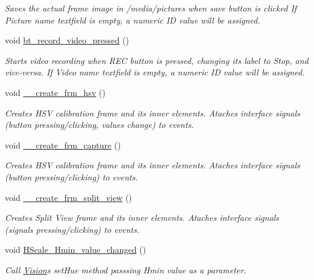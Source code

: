 \begin{DoxyCompactItemize}
\begin{DoxyCompactList}\small\item\em Saves the actual frame image in /media/pictures when \textquotesingle{}save\textquotesingle{} button is clicked If \textquotesingle{}Picture name\textquotesingle{} textfield is empty, a numeric ID value will be assigned. \end{DoxyCompactList}\item 
void \hyperlink{class_vision_g_u_i_a78a250ff8c2520a56dce79d824dbeb85}{bt\+\_\+record\+\_\+video\+\_\+pressed} ()
\begin{DoxyCompactList}\small\item\em Starts video recording when \textquotesingle{}R\+EC\textquotesingle{} button is pressed, changing its label to \textquotesingle{}Stop\textquotesingle{}, and vice-\/versa. If \textquotesingle{}Video name\textquotesingle{} textfield is empty, a numeric ID value will be assigned. \end{DoxyCompactList}\item 
void \hyperlink{class_vision_g_u_i_a5022537a86f97e3eb1e037044301a0f7}{\+\_\+\+\_\+create\+\_\+frm\+\_\+hsv} ()
\begin{DoxyCompactList}\small\item\em Creates H\+SV calibration frame and its inner elements. Ataches interface signals (button pressing/clicking, values change) to events. \end{DoxyCompactList}\item 
void \hyperlink{class_vision_g_u_i_a9b0cac7f32fc402ce5aaff0325e39b77}{\+\_\+\+\_\+create\+\_\+frm\+\_\+capture} ()
\begin{DoxyCompactList}\small\item\em Creates H\+SV calibration frame and its inner elements. Ataches interface signals (button pressing/clicking) to events. \end{DoxyCompactList}\item 
void \hyperlink{class_vision_g_u_i_aab78b384bacc2a12d385b1baef011ed4}{\+\_\+\+\_\+create\+\_\+frm\+\_\+split\+\_\+view} ()
\begin{DoxyCompactList}\small\item\em Creates Split View frame and its inner elements. Ataches interface signals (signals pressing/clicking) to events. \end{DoxyCompactList}\item 
void \hyperlink{class_vision_g_u_i_a8c01178ecd9d517e941bd6075d69bcdd}{H\+Scale\+\_\+\+Hmin\+\_\+value\+\_\+changed} ()
\begin{DoxyCompactList}\small\item\em Call \hyperlink{class_vision}{Vision}\textquotesingle{}s set\+Hue method passsing Hmin value as a parameter. \end{DoxyCompactList}\item 

\end{DoxyCompactItemize}
